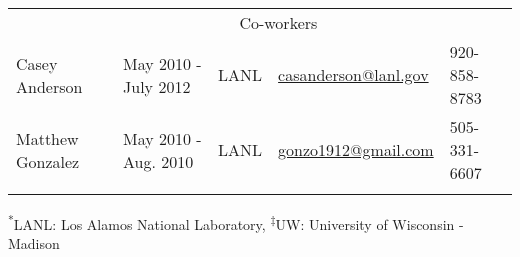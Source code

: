\begin{longtable}{lllll}
               
				                   

              & \multicolumn{3}{c}{\Large{Co-workers}} &  \\  \vspace{2mm}

{Casey Anderson}\label{cas} & {May 2010 - July 2012} & {LANL}&
\href{mailto:casanderson@lanl.com}{casanderson@lanl.gov} & 920-858-8783\\ \vspace{2mm}


{Matthew Gonzalez}\label{matt_gonzo} & {May 2010 - Aug. 2010} & {LANL} & \href{mailto:gonzo1912@gmail.com}{gonzo1912@gmail.com} & 505-331-6607\\ \vspace{2mm}
     


\vspace{-12mm} %
\end{longtable}

\footnotesize
\centering
\textsuperscript{*}LANL: Los Alamos National Laboratory, \textsuperscript{$\ddagger$}UW: University of Wisconsin - Madison \\






